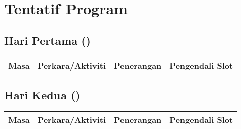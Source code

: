 \documentclass[a4paper,12pt]{article}
\begin{document}
\section{Tentatif Program}
\subsection{Hari Pertama ()}
\begin{longtable}{|p{2cm}|p{3cm}|p{7cm}|p{3cm}|}
    \hline
    \rowcolor{lightgray}
    \textbf{Masa} & \textbf{Perkara/Aktiviti} & \textbf{Penerangan} & \textbf{Pengendali Slot} \\
    \hline
    \endhead
    
\end{longtable}

\subsection{Hari Kedua ()}
\begin{longtable}{|p{2cm}|p{3cm}|p{7cm}|p{3cm}|}
    \hline
    \rowcolor{lightgray}
    \textbf{Masa} & \textbf{Perkara/Aktiviti} & \textbf{Penerangan} & \textbf{Pengendali Slot} \\
    \hline
    \endhead
    
\end{longtable}

\end{document}
